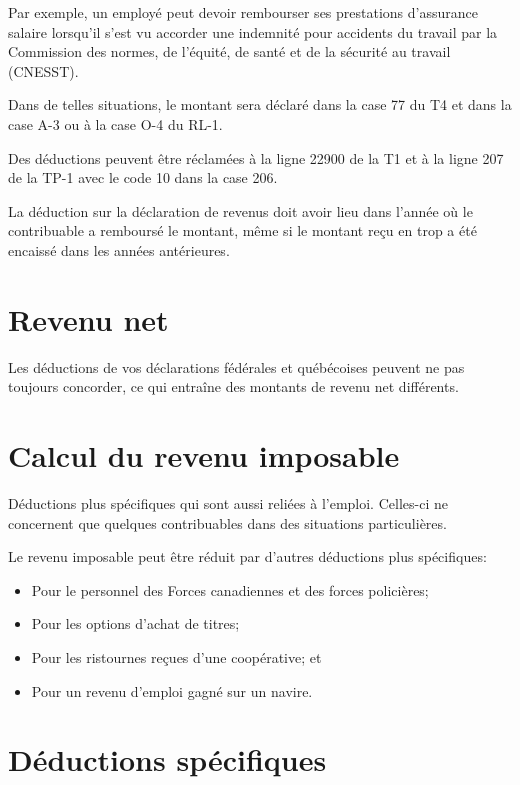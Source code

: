 Par exemple, un employé peut devoir rembourser ses prestations d'assurance salaire lorsqu'il s'est vu accorder une indemnité pour accidents du travail par la Commission des normes, de l'équité, de santé et de la sécurité au travail (CNESST).

Dans de telles situations, le montant sera déclaré dans la case 77 du T4 et dans la case A-3 ou à la case O-4 du RL-1.

Des déductions peuvent être réclamées à la ligne 22900 de la T1 et à la ligne 207 de la TP-1 avec le code 10 dans la case 206.

La déduction sur la déclaration de revenus doit avoir lieu dans l'année où le contribuable a remboursé le montant, même si le montant reçu en trop a été encaissé dans les années antérieures.



\section{Revenu net}
Les déductions de vos déclarations fédérales et québécoises peuvent ne pas toujours concorder, ce qui entraîne des montants de revenu net différents.



\section{Calcul du revenu imposable}
\begin{intro}
	Déductions plus spécifiques qui sont aussi reliées à l'emploi. Celles-ci ne concernent que quelques contribuables dans des situations particulières.
\end{intro}

Le revenu imposable peut être réduit par d'autres déductions plus spécifiques:
\begin{itemize}
	\item Pour le personnel des Forces canadiennes et des forces policières;
	\item Pour les options d'achat de titres;
	\item Pour les ristournes reçues d'une coopérative; et
	\item Pour un revenu d'emploi gagné sur un navire.
\end{itemize}



\section{Déductions spécifiques}
